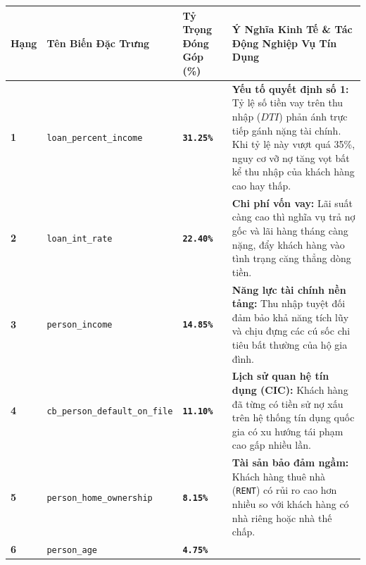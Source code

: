\documentclass[
  13pt,
  a4paper,
]{report}
\newcounter{none} %
\begin{document}
{\def\LTcaptype{none} %
\begin{longtable}[]{@{}
  >{\centering\arraybackslash}p{}
  >{\raggedright\arraybackslash}p{}
  >{\centering\arraybackslash}p{}
  >{\raggedright\arraybackslash}p{}@{}}
\toprule\noalign{}
\begin{minipage}[b]{\linewidth}\centering
Hạng
\end{minipage} & \begin{minipage}[b]{\linewidth}\raggedright
Tên Biến Đặc Trưng
\end{minipage} & \begin{minipage}[b]{\linewidth}\centering
Tỷ Trọng Đóng Góp (\%)
\end{minipage} & \begin{minipage}[b]{\linewidth}\raggedright
Ý Nghĩa Kinh Tế \& Tác Động Nghiệp Vụ Tín Dụng
\end{minipage} \\
\midrule\noalign{}
\endhead
\bottomrule\noalign{}
\endlastfoot
\textbf{1} & \texttt{loan\_percent\_income} & \textbf{\texttt{31.25\%}}
& \textbf{Yếu tố quyết định số 1:} Tỷ lệ số tiền vay trên thu nhập
(\(DTI\)) phản ánh trực tiếp gánh nặng tài chính. Khi tỷ lệ này vượt quá
35\%, nguy cơ vỡ nợ tăng vọt bất kể thu nhập của khách hàng cao hay
thấp. \\
\textbf{2} & \texttt{loan\_int\_rate} & \textbf{\texttt{22.40\%}} &
\textbf{Chi phí vốn vay:} Lãi suất càng cao thì nghĩa vụ trả nợ gốc và
lãi hàng tháng càng nặng, đẩy khách hàng vào tình trạng căng thẳng dòng
tiền. \\
\textbf{3} & \texttt{person\_income} & \textbf{\texttt{14.85\%}} &
\textbf{Năng lực tài chính nền tảng:} Thu nhập tuyệt đối đảm bảo khả
năng tích lũy và chịu đựng các cú sốc chi tiêu bất thường của hộ gia
đình. \\
\textbf{4} & \texttt{cb\_person\_default\_on\_file} &
\textbf{\texttt{11.10\%}} & \textbf{Lịch sử quan hệ tín dụng (CIC):}
Khách hàng đã từng có tiền sử nợ xấu trên hệ thống tín dụng quốc gia có
xu hướng tái phạm cao gấp nhiều lần. \\
\textbf{5} & \texttt{person\_home\_ownership} & \textbf{\texttt{8.15\%}}
& \textbf{Tài sản bảo đảm ngầm:} Khách hàng thuê nhà (\texttt{RENT}) có
rủi ro cao hơn nhiều so với khách hàng có nhà riêng hoặc nhà thế
chấp. \\
\textbf{6} & \texttt{person\_age} & \textbf{\texttt{4.75\%}} &

\end{longtable}}
\end{document}
